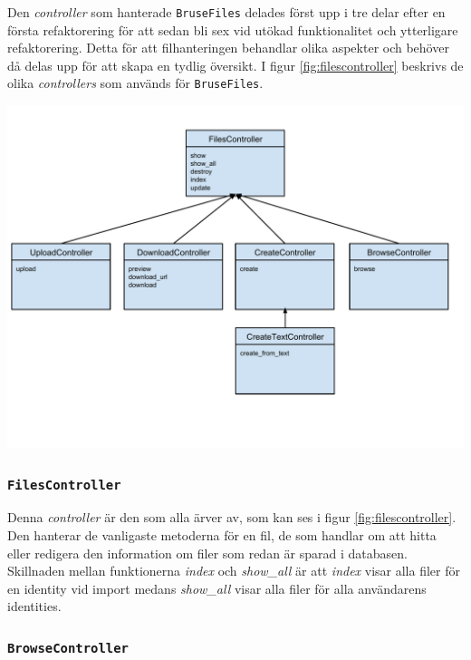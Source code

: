 Den \emph{controller} som hanterade \texttt{BruseFiles} delades först upp i tre
delar efter en första refaktorering för att sedan bli sex vid utökad
funktionalitet och ytterligare refaktorering. Detta för att filhanteringen
behandlar olika aspekter och behöver då delas upp för att skapa en tydlig
översikt. I figur \ref{fig:filescontroller} beskrivs de olika \emph{controllers}
som används för \texttt{BruseFiles}.

\begin{Figure}
  \centering
    \includegraphics[width=0.9\linewidth]{figures/filescontroller.pdf}
\end{Figure}

\subsubsection{\texttt{FilesController}}

Denna \emph{controller} är den som alla ärver av, som kan ses i figur
\ref{fig:filescontroller}. Den hanterar de vanligaste metoderna för en fil, de
som handlar om att hitta eller redigera den information om filer som redan är
sparad i databasen. Skillnaden mellan funktionerna \emph{index} och \emph{
show\_all} är att \emph{index} visar alla filer för en identity vid import
medans \emph{show\_all} visar alla filer för alla användarens identities.

\subsubsection{\texttt{BrowseController}}

